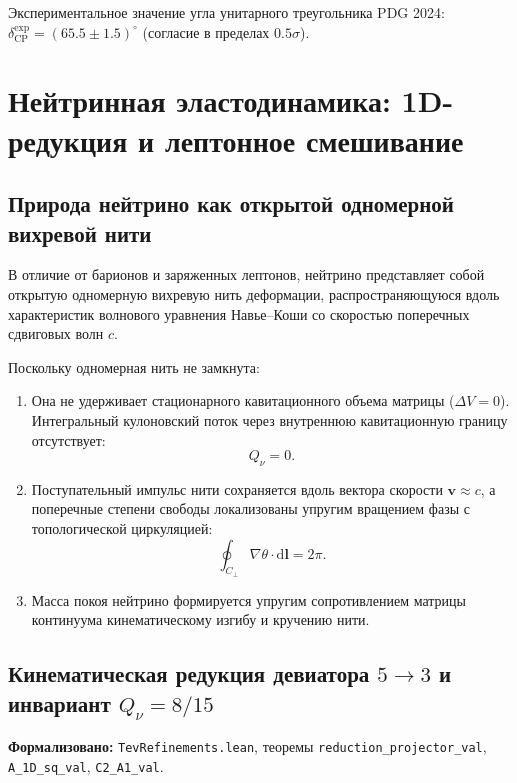 \documentclass[11pt,a4paper]{article}
\theoremstyle{definition}
\theoremstyle{remark}
\begin{document}
Экспериментальное значение угла унитарного треугольника PDG 2024: $\delta_{\mathrm{CP}}^{\mathrm{exp}} = (65.5 \pm 1.5)^\circ$ (согласие в пределах $0.5\sigma$).

\section{Нейтринная эластодинамика: 1D-редукция и лептонное смешивание}
	
\subsection{Природа нейтрино как открытой одномерной вихревой нити}
	
В отличие от барионов и заряженных лептонов, нейтрино представляет собой открытую одномерную вихревую нить деформации, распространяющуюся вдоль характеристик волнового уравнения Навье--Коши со скоростью поперечных сдвиговых волн $c$.
	
Поскольку одномерная нить не замкнута:
\begin{enumerate}
\item Она не удерживает стационарного кавитационного объема матрицы ($\Delta V = 0$). Интегральный кулоновский поток через внутреннюю кавитационную границу отсутствует:
\begin{equation}
Q_\nu = 0.
\label{eq:neutrino_charge_neutral_exact}
\end{equation}
\item Поступательный импульс нити сохраняется вдоль вектора скорости $\mathbf{v} \approx c$, а поперечные степени свободы локализованы упругим вращением фазы с топологической циркуляцией:
\begin{equation}
\oint_{C_\perp} \nabla\theta \cdot \mathrm{d}\mathbf{l} = 2\pi.
\label{eq:neutrino_circulation_quantum}
\end{equation}
\item Масса покоя нейтрино формируется упругим сопротивлением матрицы континуума кинематическому изгибу и кручению нити.
\end{enumerate}
	
\subsection{Кинематическая редукция девиатора $5 \to 3$ и инвариант $Q_\nu = 8/15$}
\noindent\small\textbf{Формализовано:} \texttt{TevRefinements.lean}, теоремы \texttt{reduction\_projector\_val}, \texttt{A\_1D\_sq\_val}, \texttt{C2\_A1\_val}.
	
\end{document}
